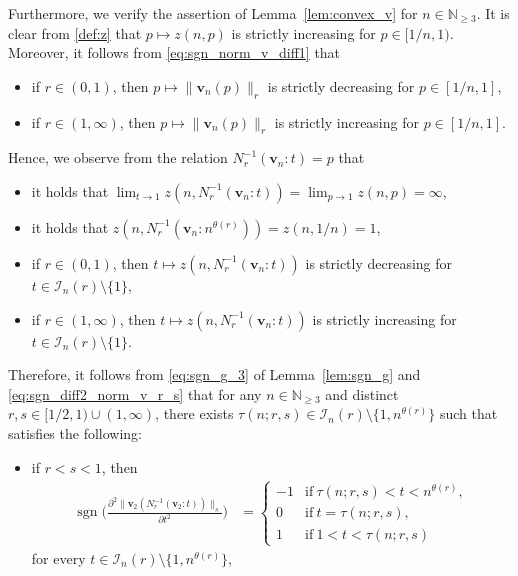 \documentclass[conference, draftcls, onecolumn]{IEEEtran}
\theoremstyle{plain}
\newcommand{\bvec}[1]{\boldsymbol{#1}}
\newcommand{\sgn}{\operatorname{sgn}}
\newcommand{\lemref}[1]{Lemma~\ref{#1}}
\begin{document}
\begin{IEEEproof}[Proof of \lemref{lem:convex_v}]
Furthermore, we verify the assertion of \lemref{lem:convex_v} for $n \in \mathbb{N}_{\ge 3}$.
It is clear from \eqref{def:z} that $p \mapsto z(n, p)$ is strictly increasing for $p \in [1/n, 1)$.
Moreover, it follows from \eqref{eq:sgn_norm_v_diff1} that
\begin{itemize}
\item
if $r \in (0, 1)$, then $p \mapsto \| \bvec{v}_{n}( p ) \|_{r}$ is strictly decreasing for $p \in [1/n, 1]$,
\item
if $r \in (1, \infty)$, then $p \mapsto \| \bvec{v}_{n}( p ) \|_{r}$ is strictly increasing for $p \in [1/n, 1]$.
\end{itemize}
Hence, we observe from the relation $N_{r}^{-1}( \bvec{v}_{n} : t ) = p$ that
\begin{itemize}
\item
it holds that $\lim_{t \to 1} z(n, N_{r}^{-1}( \bvec{v}_{n} : t )) = \lim_{p \to 1} z(n, p) = \infty$,
\item
it holds that $z(n, N_{r}^{-1}( \bvec{v}_{n} : n^{\theta( r )} )) = z(n, 1/n) = 1$,
\item
if $r \in (0, 1)$, then $t \mapsto z(n, N_{r}^{-1}( \bvec{v}_{n} : t ))$ is strictly decreasing for $t \in \mathcal{I}_{n}( r ) \setminus \{ 1 \}$,
\item
if $r \in (1, \infty)$, then $t \mapsto z(n, N_{r}^{-1}( \bvec{v}_{n} : t ))$ is strictly increasing for $t \in \mathcal{I}_{n}( r ) \setminus \{ 1 \}$.
\end{itemize}
Therefore, it follows from \eqref{eq:sgn_g_3} of \lemref{lem:sgn_g} and \eqref{eq:sgn_diff2_norm_v_r_s} that for any $n \in \mathbb{N}_{\ge 3}$ and distinct $r, s \in [1/2, 1) \cup (1, \infty)$, there exists $\tau(n; r, s) \in \mathcal{I}_{n}( r ) \setminus \{ 1, n^{\theta( r )} \}$ such that satisfies the following:
\begin{itemize}
\item
if $r < s < 1$, then
\begin{align}
\sgn \bigg( \frac{ \partial^{2} \| \bvec{v}_{2}( N_{r}^{-1}( \bvec{v}_{2} : t ) ) \|_{s} }{ \partial t^{2} } \bigg)
& =
\begin{cases}
-1
& \mathrm{if} \ \tau(n; r, s) < t < n^{\theta( r )} ,
\\
0
& \mathrm{if} \ t = \tau(n; r, s) ,
\\
1
& \mathrm{if} \ 1 < t < \tau(n; r, s)
\end{cases}
\label{eq:sgn_diff2_norm_r_s_v_1}
\end{align}
for every $t \in \mathcal{I}_{n}( r ) \setminus \{ 1, n^{\theta( r )} \}$,

\end{itemize}
\end{IEEEproof}
\end{document}
